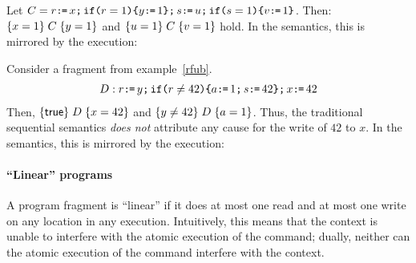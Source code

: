 Let $\aCmd = r \GETS x \SEMI \IF{r=1} \THEN y \GETS 1 \FI \SEMI s \GETS u \SEMI \IF{s=1} \THEN v \GETS 1 \FI$.  Then:
$ \hoare{x=1}{\aCmd}{y=1}$ and
$ \hoare{u=1}{\aCmd}{v=1}$
hold.  In the semantics, this is mirrored by the execution:
\begin{tikzdisplay}[node distance=1em]
\end{tikzdisplay}


Consider a fragment from example~\eqref{rfub}.
\begin{align*}
\bCmd:  r \GETS y \SEMI \IF{r \NOTEQ 42} \THEN a \GETS 1 \SEMI s \GETS 42 \FI \SEMI x \GETS 42
\end{align*}
Then, $\hoare{\TRUE}{\bCmd}{x=42} $ and $\hoare{y \neq 42}{\bCmd}{a= 1} $.  Thus, the traditional sequential semantics {\em does not} attribute any cause for the write of $42$ to $x$.  
In the semantics, this is mirrored by the execution:
\begin{tikzdisplay}[node distance=1em]
\end{tikzdisplay}

\paragraph{``Linear'' programs}

A program fragment is ``linear'' if it does at most one read and at most one write on any location in any execution.  Intuitively, this means that the context is unable to interfere with the atomic execution of the command; dually, neither can the atomic execution of the command interfere with the context.  



